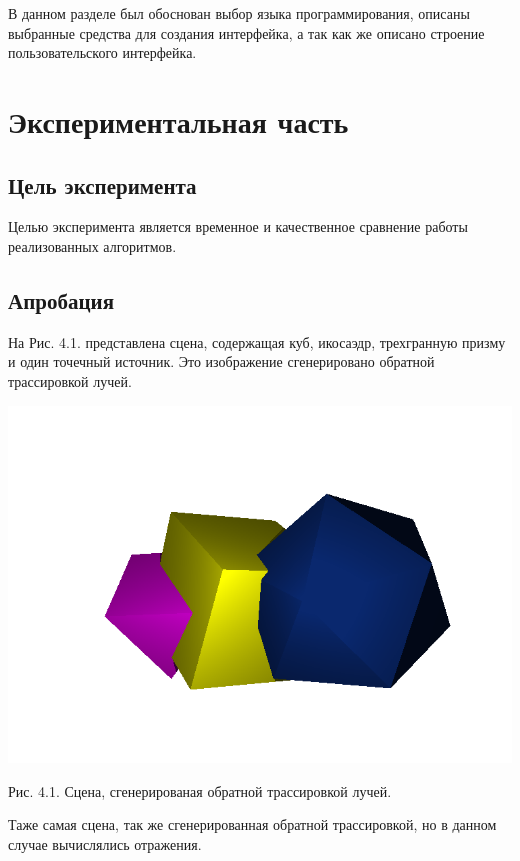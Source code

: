 \documentclass[12pt]{report}
\begin{document}
	В данном разделе был обоснован выбор языка программирования, описаны выбранные средства для создания интерфейка, а так как же описано строение пользовательского интерфейка.


	\chapter{Экспериментальная часть}
	
	\section{Цель эксперимента}
	
	Целью эксперимента является временное и качественное сравнение работы реализованных алгоритмов.
	
	\section{Апробация}
	
	На Рис. 4.1. представлена сцена, содержащая куб, икосаэдр, трехгранную призму и один точечный источник. Это изображение сгенерировано обратной трассировкой лучей.
	
	\begin{center}
		\includegraphics[scale=0.8]{rt.png}
		
		Рис. 4.1. Сцена, сгенерированая обратной трассировкой лучей.
	\end{center}

	Таже самая сцена, так же сгенерированная обратной трассировкой, но в данном случае вычислялись отражения.
	
\end{document}
